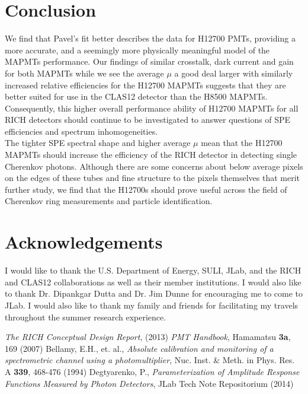 \documentclass[prc,twocolumn]{revtex4}
\begin{document}
\section{Conclusion}
	We find that Pavel's fit better describes the data for H12700 PMTs, providing a more accurate, and a seemingly more physically meaningful model of the MAPMTs performance. Our findings of similar crosstalk, dark current and gain for both MAPMTs while we see the average $\mu$ a good deal larger with similarly increased relative efficiencies for the H12700 MAPMTs suggests that they are better suited for use in the CLAS12 detector than the H8500 MAPMTs. Consequently, this higher overall performance ability of H12700 MAPMTs for all RICH detectors should continue to be investigated to answer questions of SPE efficiencies and spectrum inhomogeneities.
	\\
	\indent The tighter SPE spectral shape and higher average $\mu$ mean that the H12700 MAPMTs should increase the efficiency of the RICH detector in detecting single Cherenkov photons. Although there are some concerns about below average pixels on the edges of these tubes and fine structure to the pixels themselves that merit further study, we find that the H12700s should prove useful across the field of Cherenkov ring measurements and particle identification.
	
	
\section*{Acknowledgements}
	
	I would like to thank the U.S. Department of Energy, SULI, JLab, and the RICH and CLAS12 collaborations as well as their member institutions. I would also like to thank Dr. Dipankgar Dutta and Dr. Jim Dunne for encouraging me to come to JLab. I would also like to thank my family and friends for facilitating my travels throughout the summer research experience.
	
\begin{thebibliography}{99}

	 \textit{The RICH Conceptual Design Report}, (2013)
	 \textit{PMT Handbook}, Hamamatsu \textbf{3a}, 169 (2007)
	 Bellamy, E.H., et. al., \textit{Absolute calibration and monitoring of a spectrometric channel using a photomultiplier}, Nuc. Inst. \& Meth. in Phys. Res. A \textbf{339}, 468-476 (1994)
	 Degtyarenko, P., \textit{Parameterization of Amplitude Response Functions Measured by Photon Detectors}, JLab Tech Note Repositorium (2014)	
	
\end{thebibliography}
\end{document}
